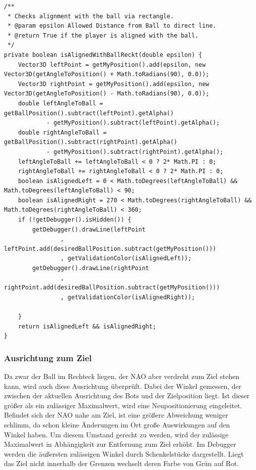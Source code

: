 \begin{lstlisting}[caption=Ausrichtung zum Ball, captionpos=b, label=lst:aligned-with-ball]
/**
 * Checks alignment with the ball via rectangle.
 * @param epsilon Allowed Distance from Ball to direct line.
 * @return True if the player is aligned with the ball.
 */
private boolean isAlignedWithBallReckt(double epsilon) {
    Vector3D leftPoint = getMyPosition().add(epsilon, new Vector3D(getAngleToPosition() + Math.toRadians(90), 0.0));
    Vector3D rightPoint = getMyPosition().add(epsilon, new Vector3D(getAngleToPosition() - Math.toRadians(90), 0.0));
    double leftAngleToBall = getBallPosition().subtract(leftPoint).getAlpha()
            - getMyPosition().subtract(leftPoint).getAlpha();
    double rightAngleToBall = getBallPosition().subtract(rightPoint).getAlpha()
            - getMyPosition().subtract(rightPoint).getAlpha();
    leftAngleToBall += leftAngleToBall < 0 ? 2* Math.PI : 0;
    rightAngleToBall += rightAngleToBall < 0 ? 2* Math.PI : 0;
    boolean isAlignedLeft = 0 < Math.toDegrees(leftAngleToBall) && Math.toDegrees(leftAngleToBall) < 90;
    boolean isAlignedRight = 270 < Math.toDegrees(rightAngleToBall) && Math.toDegrees(rightAngleToBall) < 360;
    if (!getDebugger().isHidden()) {
        getDebugger().drawLine(leftPoint
                , leftPoint.add(desiredBallPosition.subtract(getMyPosition()))
                , getValidationColor(isAlignedLeft));
        getDebugger().drawLine(rightPoint
                , rightPoint.add(desiredBallPosition.subtract(getMyPosition()))
                , getValidationColor(isAlignedRight));

    }
    return isAlignedLeft && isAlignedRight;
}
\end{lstlisting}

\subsubsection{Ausrichtung zum Ziel}
Da zwar der Ball im Rechteck liegen, der NAO aber verdreht zum Ziel stehen kann, wird auch diese Ausrichtung überprüft. Dabei der Winkel gemessen, der zwischen der aktuellen Ausrichtung des Bots und der Zielposition liegt. Ist dieser größer als ein zulässiger Maximalwert, wird eine Neupositionierung eingeleitet.\\
Befindet sich der NAO nahe am Ziel, ist eine größere Abweichung weniger schlimm, da schon kleine Änderungen im Ort große Auswirkungen auf den Winkel haben. Um diesem Umstand gerecht zu werden, wird der zulässige Maximalwert in Abhängigkeit zur Entfernung zum Ziel erhöht. Im Debugger werden die äußersten zulässigen Winkel durch Schenkelstücke dargestellt. Liegt das Ziel nicht innerhalb der Grenzen wechselt deren Farbe von Grün auf Rot.


